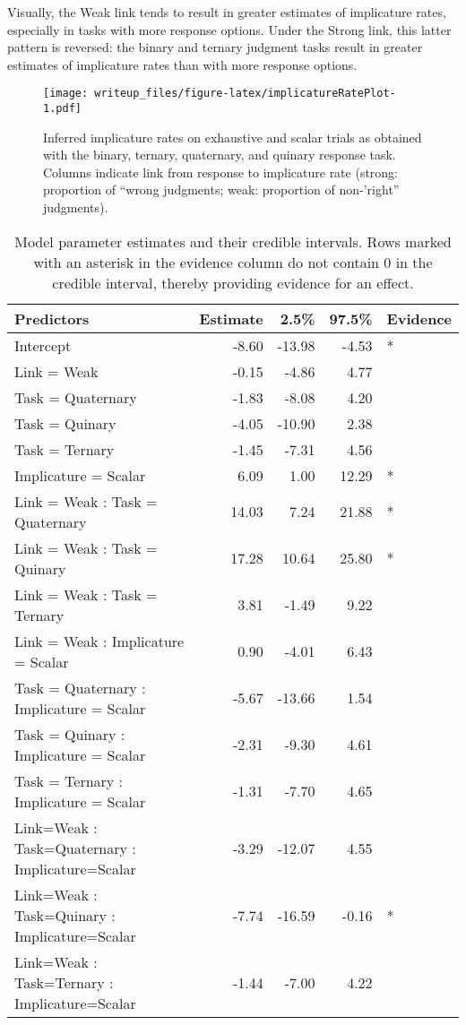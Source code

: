 \documentclass[man]{apa6}
\theoremstyle{definition}
\theoremstyle{definition}
\theoremstyle{definition}
\theoremstyle{remark}
\begin{document}
Visually, the Weak link tends to result in greater estimates of
implicature rates, especially in tasks with more response options. Under
the Strong link, this latter pattern is reversed: the binary and ternary
judgment tasks result in greater estimates of implicature rates than
with more response options.

\begin{figure}
\centering
\texttt{[image: writeup\_files/figure-latex/implicatureRatePlot-1.pdf]}
\caption{\label{fig:implicatureRatePlot}Inferred implicature rates on
exhaustive and scalar trials as obtained with the binary, ternary,
quaternary, and quinary response task. Columns indicate link from
response to implicature rate (strong: proportion of \enquote{wrong
judgments; weak: proportion of non-'right} judgments).}
\end{figure}

\begin{table}

\caption{\label{tab:implicatureRate}\label{tab:modeltable}Model parameter estimates and their credible intervals. Rows marked with an asterisk in the evidence column do not contain 0 in the credible interval, thereby providing evidence for an effect.}
\centering
\begin{tabular}[t]{lrrrl}
\toprule
Predictors & Estimate & 2.5\% & 97.5\% & Evidence\\
\midrule
Intercept & -8.60 & -13.98 & -4.53 & *\\
Link = Weak & -0.15 & -4.86 & 4.77 & \\
Task = Quaternary & -1.83 & -8.08 & 4.20 & \\
Task = Quinary & -4.05 & -10.90 & 2.38 & \\
Task = Ternary & -1.45 & -7.31 & 4.56 & \\
\addlinespace
Implicature = Scalar & 6.09 & 1.00 & 12.29 & *\\
Link = Weak : Task = Quaternary & 14.03 & 7.24 & 21.88 & *\\
Link = Weak : Task = Quinary & 17.28 & 10.64 & 25.80 & *\\
Link = Weak : Task = Ternary & 3.81 & -1.49 & 9.22 & \\
Link = Weak : Implicature = Scalar & 0.90 & -4.01 & 6.43 & \\
\addlinespace
Task = Quaternary : Implicature = Scalar & -5.67 & -13.66 & 1.54 & \\
Task = Quinary : Implicature = Scalar & -2.31 & -9.30 & 4.61 & \\
Task = Ternary : Implicature = Scalar & -1.31 & -7.70 & 4.65 & \\
Link=Weak : Task=Quaternary : Implicature=Scalar & -3.29 & -12.07 & 4.55 & \\
Link=Weak : Task=Quinary : Implicature=Scalar & -7.74 & -16.59 & -0.16 & *\\
Link=Weak : Task=Ternary : Implicature=Scalar & -1.44 & -7.00 & 4.22 & \\
\bottomrule
\end{tabular}
\end{table}
\end{document}
